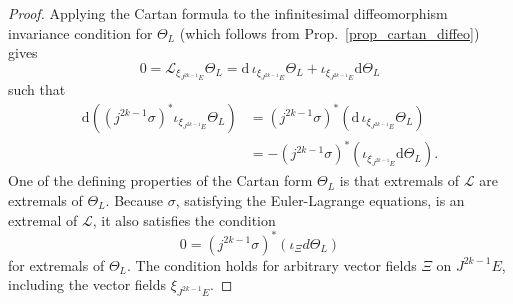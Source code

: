 \begin{proof}
  Applying the Cartan formula to the infinitesimal diffeomorphism invariance condition for $\Theta_L$ (which follows from Prop.\ \ref{prop_cartan_diffeo}) gives
  \begin{equation}
    0 = \mathcal L_{\xi_{J^{2k-1}E}} \Theta_L = \mathrm d\,\iota_{\xi_{J^{2k-1}E}} \Theta_L + \iota_{\xi_{J^{2k-1}E}} \mathrm d \Theta_L
  \end{equation}
  such that
  \begin{equation}
    \begin{aligned}
      \mathrm d \left((j^{2k-1}\sigma)^\ast \iota_{\xi_{J^{2k-1}E}} \Theta_L \right) &{} = (j^{2k-1}\sigma)^\ast ( \mathrm d\,\iota_{\xi_{J^{2k-1}E}} \Theta_L ) \\
                                                                             &{} = -(j^{2k-1}\sigma)^\ast (\iota_{\xi_{J^{2k-1}E}} \mathrm d \Theta_L ).
    \end{aligned}
  \end{equation}
  One of the defining properties of the Cartan form $\Theta_L$ is that extremals of $\mathscr L$ are extremals of $\Theta_L$. Because $\sigma$, satisfying the Euler-Lagrange equations, is an extremal of $\mathscr L$, it also satisfies the condition\cite{Gotay_1991}
  \begin{equation}
    0 = (j^{2k-1}\sigma)^\ast (\iota_\Xi d \Theta_L)
  \end{equation}
  for extremals of $\Theta_L$. The condition holds for arbitrary vector fields $\Xi$ on $J^{2k-1}E$, including the vector fields $\xi_{J^{2k-1}E}$.
\end{proof}

